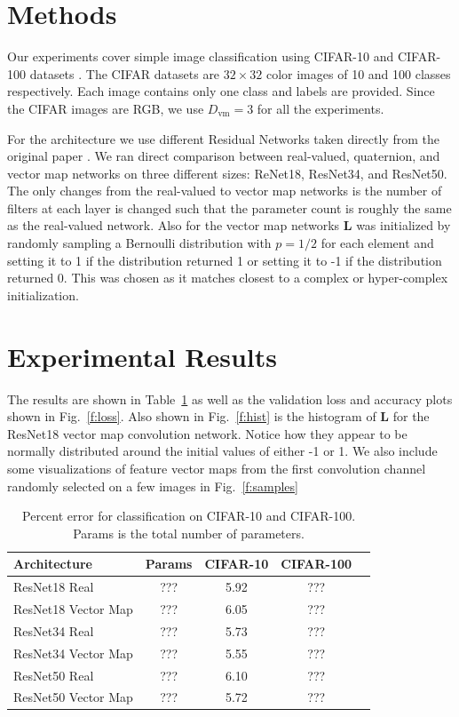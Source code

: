 \documentclass[14pt,a4paper]{article}
\begin{document}
\section{Methods}
Our experiments cover simple image classification using CIFAR-10 and CIFAR-100 datasets \cite{krizhevsky2009learning}.
The CIFAR datasets are $32\times32$ color images of 10 and 100 classes respectively.
Each image contains only one class and labels are provided.
Since the CIFAR images are RGB, we use $D_\mathrm{vm} = 3$ for all the experiments.

For the architecture we use different Residual Networks taken directly from the original paper \cite{he2015deep}.
We ran direct comparison between real-valued, quaternion, and vector map networks on three different sizes: ReNet18, ResNet34, and ResNet50.
The only changes from the real-valued to vector map networks is the number of filters at each layer is changed such that the parameter count is roughly the same as the real-valued network.
Also for the vector map networks $\textbf{L}$ was initialized by randomly sampling a Bernoulli distribution with $p=1/2$ for each element and setting it to 1 if the distribution returned 1 or setting it to -1 if the distribution returned 0.
This was chosen as it matches closest to a complex or hyper-complex initialization.


\section{Experimental Results}
The results are shown in Table~\ref{t:results} as well as the validation loss and accuracy plots shown in Fig.~\ref{f:loss}. 
Also shown in Fig.~\ref{f:hist} is the histogram of $\textbf{L}$ for the ResNet18 vector map convolution network.
Notice how they appear to be normally distributed around the initial values of either -1 or 1.
We also include some visualizations of feature vector maps from the first convolution channel randomly selected on a few images in Fig.~\ref{f:samples}

\begin{table}[h]
	\centering
		\begin{tabular}{l c c c c}
			\hline
			Architecture & Params & CIFAR-10 & CIFAR-100 \\
			\hline
			ResNet18 Real & ??? & 5.92 & ??? \\
			ResNet18 Vector Map & ??? & 6.05 & ??? \\
			\hline
			ResNet34 Real & ??? & 5.73 & ??? \\
			ResNet34 Vector Map & ??? & 5.55 & ??? \\
			\hline
			ResNet50 Real & ??? & 6.10 & ??? \\
			ResNet50 Vector Map & ??? & 5.72 & ??? \\
			\hline
		\end{tabular}
	\caption{Percent error for classification on CIFAR-10 and CIFAR-100. Params is the total number of parameters.}
	\label{t:results}
\end{table}
\end{document}
